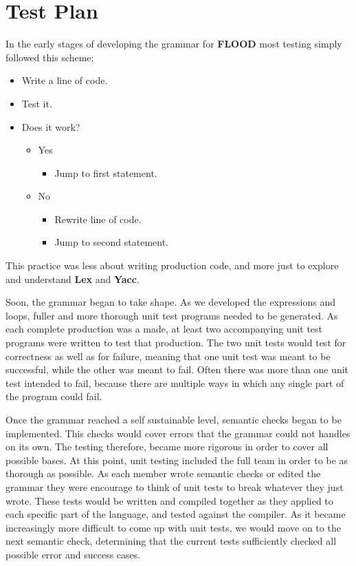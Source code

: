 \documentclass[12pt]{report}
\begin{document}
\chapter{Test Plan}

In the early stages of developing the grammar for \textbf{FLOOD} most testing simply followed this scheme:

\begin{itemize}
\item Write a line of code.
\item Test it.
\item Does it work?
\begin{itemize}
\item Yes
\begin{itemize}
\item Jump to first statement.
\end{itemize}
\item No
\begin{itemize}
\item Rewrite line of code.
\item Jump to second statement.
\end{itemize}
\end{itemize}
\end{itemize}

This practice was less about writing production code, and more just to explore and understand \textbf{Lex} and \textbf{Yacc}.

Soon, the grammar began to take shape. As we developed the expressions and loops, fuller and more thorough unit test programs needed to be generated. As each complete production was a made, at least two accompanying unit test programs were written to test that production. The two unit tests would test for correctness as well as for failure, meaning that one unit test was meant to be successful, while the other was meant to fail. Often there was more than one unit test intended to fail, because there are multiple ways in which any single part of the program could fail.

Once the grammar reached a self sustainable level, semantic checks began to be implemented. This checks would cover errors that the grammar could not handles on its own. The testing therefore, became more rigorous in order to cover all possible bases. At this point, unit testing included the full team in order to be as thorough as possible. As each member wrote semantic checks or edited the grammar they were encourage to think of unit tests to break whatever they just wrote. These tests would be written and compiled together as they applied to each specific part of the language, and tested against the compiler. As it became increasingly more difficult to come up with unit tests, we would move on to the next semantic check, determining that the current tests sufficiently checked all possible error and success cases.
\end{document}
